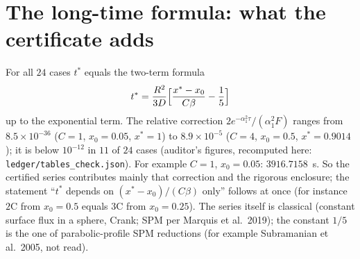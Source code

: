 \documentclass[10pt]{article}
\begin{document}
\section{The long-time formula: what the certificate adds}\label{sec:longtime}
For all $24$ cases $t^*$ equals the two-term formula
\[
t^*=\frac{R^2}{3D}\Bigl[\frac{x^*-x_0}{C\beta}-\frac15\Bigr]
\]
up to the exponential term. The relative correction $2e^{-\alpha_1^2\tau}/(\alpha_1^2F)$ ranges from $8.5\times10^{-36}$ ($C=1$, $x_0=0.05$, $x^*=1$) to $8.9\times10^{-5}$ ($C=4$, $x_0=0.5$, $x^*=0.9014$); it is below $10^{-12}$ in $11$ of $24$ cases (auditor's figures, recomputed here: \texttt{ledger/tables\_check.json}). For example $C=1$, $x_0=0.05$: $3916.7158$~s. So the certified series contributes mainly that correction and the rigorous enclosure; the statement ``$t^*$ depends on $(x^*-x_0)/(C\beta)$ only'' follows at once (for instance $2$C from $x_0=0.5$ equals $3$C from $x_0=0.25$). The series itself is classical (constant surface flux in a sphere, Crank; SPM per Marquis et al.\ 2019); the constant $1/5$ is the one of parabolic-profile SPM reductions (for example Subramanian et al.\ 2005, not read).

\end{document}

